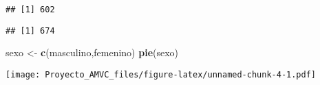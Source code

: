 \documentclass[
]{article}
\newenvironment{Shaded}{\begin{snugshade}}{\end{snugshade}}
\newcommand{\CommentTok}[1]{\textcolor[rgb]{0.56,0.35,0.01}{\textit{#1}}}
\newcommand{\DecValTok}[1]{\textcolor[rgb]{0.00,0.00,0.81}{#1}}
\newcommand{\FunctionTok}[1]{\textcolor[rgb]{0.13,0.29,0.53}{\textbf{#1}}}
\newcommand{\NormalTok}[1]{#1}
\newcommand{\OtherTok}[1]{\textcolor[rgb]{0.56,0.35,0.01}{#1}}
\newcommand{\SpecialCharTok}[1]{\textcolor[rgb]{0.81,0.36,0.00}{\textbf{#1}}}
\begin{document}
\begin{Shaded}
\end{Shaded}

\begin{verbatim}
## [1] 602
\end{verbatim}

\begin{Shaded}
\end{Shaded}

\begin{verbatim}
## [1] 674
\end{verbatim}

\begin{Shaded}
\begin{Highlighting}[]
\NormalTok{sexo }\OtherTok{\textless{}{-}} \FunctionTok{c}\NormalTok{(masculino,femenino)}
\FunctionTok{pie}\NormalTok{(sexo)}
\end{Highlighting}
\end{Shaded}

\texttt{[image: Proyecto\_AMVC\_files/figure-latex/unnamed-chunk-4-1.pdf]}
\end{document}
